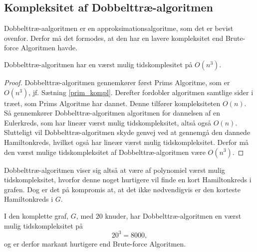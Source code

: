 \subsection{Kompleksitet af Dobbelttræ-algoritmen}
Dobbelttræ-aalgoritmen er en approksimationsalgoritme, som det er bevist ovenfor. Derfor må det formodes, at den har en lavere kompleksitet end Brute-force Algoritmen havde.

\begin{thm}
Dobbelttræ-algoritmen har en værst mulig tidskomplesitet på $O(n^3)$.
\end{thm}

\begin{proof}
Dobbelttræ-algoritmen gennemkører først Prims Algoritme, som er $O(n^3)$, jf. Sætning \ref{prim_kompl}. 
Derefter fordobler algoritmen samtlige sider i træet, som Prims Algoritme har dannet. Denne tilfører kompleksiteten $O(n)$.
Så gennemkører Dobbelttræ-algoritmen algoritmen for dannelsen af en Eulerkreds, som har lineær værst mulig tidskompleksitet, altså også $O(n)$.
Slutteligt vil Dobbelttræ-algoritmen skyde genvej ved at gennemgå den dannede Hamiltonkreds, hvilket også har lineær værst mulig tidskompleksitet. 
Derfor må den værst mulige tidskompleksitet af Dobbelttræ-algoritmen være $O(n^3)$.
\end{proof}

Dobbelttræ-algoritmen viser sig altså at være af polynomiel værst mulig tidskompleksitet, hvorfor denne noget hurtigere vil finde en kort Hamiltonkreds i grafen. Dog er det på kompromis at, at det ikke nødvendigvis er den korteste Hamiltonkreds i $G$.

\begin{exmp}
I den komplette graf, $G$, med $20$ knuder, har Dobbelttræ-algoritmen en værst mulig tidskompleksitet på $$20^3 = 8000,$$ og er derfor markant hurtigere end Brute-force Algoritmen.
\end{exmp}




